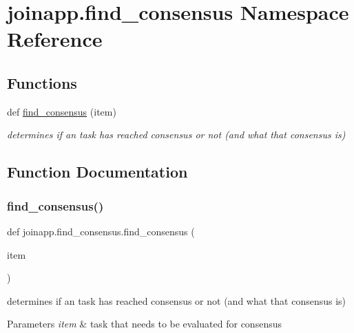 \hypertarget{namespacejoinapp_1_1find__consensus}{}\section{joinapp.\+find\+\_\+consensus Namespace Reference}
\label{namespacejoinapp_1_1find__consensus}
\subsection*{Functions}
\begin{DoxyCompactItemize}
\item 
def \mbox{\hyperlink{namespacejoinapp_1_1find__consensus_ac44516941ca78eb6568689fc4dd62648}{find\+\_\+consensus}} (item)
\begin{DoxyCompactList}\small\item\em determines if an task has reached consensus or not (and what that consensus is) \end{DoxyCompactList}\end{DoxyCompactItemize}


\subsection{Function Documentation}
\mbox{\label{namespacejoinapp_1_1find__consensus_ac44516941ca78eb6568689fc4dd62648}} 
\subsubsection{\texorpdfstring{find\_consensus()}{find\_consensus()}}
{\footnotesize\ttfamily def joinapp.\+find\+\_\+consensus.\+find\+\_\+consensus (\begin{DoxyParamCaption}\item[{}]{item }\end{DoxyParamCaption})}



determines if an task has reached consensus or not (and what that consensus is) 


\begin{DoxyParams}{Parameters}
{\em item} & task that needs to be evaluated for consensus \\
\hline
\end{DoxyParams}
